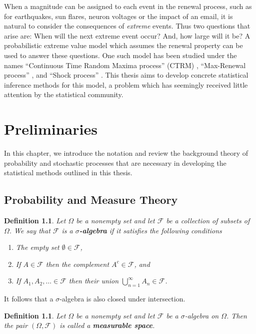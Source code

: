 \documentclass[honours,12pt]{unswthesis}
\newcommand{\1}{\mathbf 1}
\newcommand{\FF}{\mathcal{F}}
\newtheorem{definition}[equation]{Definition}
\numberwithin{equation}{section}
\theoremstyle{definition}
\theoremstyle{remark}
\begin{document}
When a magnitude can be assigned to each event in the renewal process, 
such as for earthquakes, sun flares, neuron voltages or the impact of an email, it is natural to consider the consequences of \emph{extreme} events. Thus two questions that arise are: 
When will the next extreme event occur? And, how large will it be?
A probabilistic extreme value model which assumes the renewal property can be used to answer these questions. One such model has been studied under the names
``Continuous Time Random Maxima process'' (CTRM) 
\cite{Benson2007,Meerschaert2009,Hees16,Heesa}, 
``Max-Renewal process'' \cite{Silvestrov2002a,ST04,Basrak2014}, 
and ``Shock process'' 
\cite{Esary1973,Sumita1983,Sumita1984,Sumita1985,Anderson1987,Gut1999}.
This thesis aims to develop concrete statistical inference methods for this model, 
a problem which has seemingly received little attention by the statistical 
community.



\chapter{Preliminaries}\label{prelim}
In this chapter, we introduce the notation and review the background theory of probability and stochastic processes that are necessary in developing the statistical methods outlined in this thesis.
\section{Probability and Measure Theory}

\begin{definition}
Let $\Omega$ be a nonempty set and let $\FF$ be a collection of subsets of $\Omega$. We say that $\FF$ is a \textbf{$\sigma$-algebra} if it satisfies the following conditions
\begin{enumerate}
\item The empty set $\emptyset \in \FF$,
\item If $A\in \FF$ then the complement $A^c\in \FF$, and
\item If $A_1,A_2,\ldots \in \FF$ then their union $\bigcup_{n=1}^\infty A_n \in \FF$.
\end{enumerate}
\end{definition}
\noindent It follows that a $\sigma$-algebra is also closed under intersection.\\
\begin{definition}
Let $\Omega$ be a nonempty set and let $\FF$ be a $\sigma$-algebra on $\Omega$. Then the pair $(\Omega,\FF)$ is called a \textbf{measurable space}.\\
\end{definition}
\end{document}
